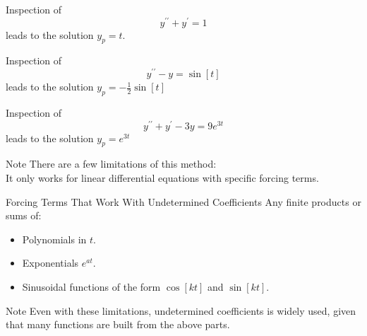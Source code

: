 \documentclass{beamer}
\begin{document}
\begin{frame}
\begin{example}
Inspection of
\begin{equation*}
y^{\prime\prime}+y^{\prime}=1
\end{equation*}\pause 
leads to the solution $y_p=t$.
\end{example}\pause

\begin{example}
Inspection of
\begin{equation*}
y^{\prime\prime}-y=\sin[t]
\end{equation*}\pause
leads to the solution $y_p=-\tfrac{1}{2}\sin[t]$
\end{example}\pause

\begin{example}
Inspection of
\begin{equation*}
y^{\prime\prime}+y^{\prime}-3y=9e^{3t}
\end{equation*}\pause
leads to the solution $y_p=e^{3t}$
\end{example}
\end{frame}

\begin{frame}
\begin{block}{Note}
There are a few limitations of this method:\\ It only works for linear differential equations with specific forcing terms.
\end{block}\pause

\begin{block}{Forcing Terms That Work With Undetermined Coefficients}
Any finite products or sums of:
\begin{itemize}
\item Polynomials in $t$.
\item Exponentials $e^{at}$.
\item Sinusoidal functions of the form $\cos[kt]$ and $\sin[kt]$.
\end{itemize}
\end{block}\pause
\begin{block}{Note}
Even with these limitations, undetermined coefficients is widely used, given that many functions are built from the above parts.
\end{block}
\end{frame}
\end{document}
